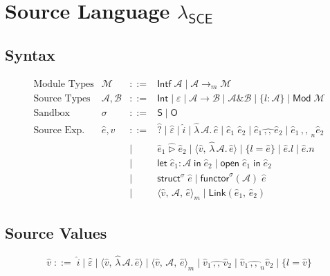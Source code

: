 \documentclass{article}
\newcommand{\fatcomma}{\mathbin{\,{,}{,}\,}}
\newcommand{\tand}{\mathbin{\&}}
\newcommand{\tarr}{\rightarrow}
\newcommand{\kw}[1]{\mathsf{#1}}
\newcommand{\smark}{\mathsf{S}}
\newcommand{\omark}{\mathsf{O}}
\newcommand{\shat}[1]{\hat{#1}}
\newcommand{\squery}{\hat{\textsf{?}}}
\newcommand{\slam}{\hat{\lambda}}
\newcommand{\sbox}{\mathbin{\hat{\triangleright}}}
\newcommand{\sdmrg}{\mathbin{\hat{\fatcomma}}}
\newcommand{\snmrg}{\mathbin{\hat{\fatcomma}_n}}
\newcommand{\mclos}[3]{\langle #1,\,#2,\,#3 \rangle_m}
\newcommand{\sclos}[3]{\langle #1,\,\slam\,#2.\,#3 \rangle}
\newcommand{\Link}[2]{\kw{Link}(#1,\,#2)}
\newcommand{\Struct}[2]{\kw{struct}^{#1}\;#2}
\newcommand{\Functor}[3]{\kw{functor}^{#1}(#2)\;#3}
\newcommand{\slet}[3]{\kw{let}\;#1:#2\;\kw{in}\;#3}
\newcommand{\sopen}[2]{\kw{open}\;#1\;\kw{in}\;#2}
\newcommand{\srec}[2]{\{#1 = #2\}}
\begin{document}
\section{Source Language $\lambda_{\mathsf{SCE}}$}

\subsection{Syntax}

\[
\begin{array}{lrcl}
\text{Module Types}  & \mathcal{M} & ::= & \kw{Intf}\;\mathcal{A}
                                     \mid  \mathcal{A} \tarr_m \mathcal{M} \\[4pt]
\text{Source Types}   & \mathcal{A}, \mathcal{B} & ::= &
    \kw{Int} \mid \varepsilon
    \mid \mathcal{A} \tarr \mathcal{B}
    \mid \mathcal{A} \tand \mathcal{B}
    \mid \{l : \mathcal{A}\}
    \mid \kw{Mod}\;\mathcal{M} \\[4pt]
\text{Sandbox}   & \sigma & ::= & \smark \mid \omark \\[4pt]
\text{Source Exp.} & \shat{e}, \shat{v} & ::= &
    \squery \mid \hat{\varepsilon} \mid \hat{i}
    \mid \slam\,\mathcal{A}.\,\shat{e}
    \mid \shat{e}_1\;\shat{e}_2
    \mid \shat{e}_1 \sdmrg \shat{e}_2
    \mid \shat{e}_1 \snmrg \shat{e}_2 \\
  & & \mid & \shat{e}_1 \sbox \shat{e}_2
    \mid \sclos{\shat{v}}{\mathcal{A}}{\shat{e}}
    \mid \srec{l}{\shat{e}}
    \mid \shat{e}.l
    \mid \shat{e}.n \\
  & & \mid & \slet{\shat{e}_1}{\mathcal{A}}{\shat{e}_2}
    \mid \sopen{\shat{e}_1}{\shat{e}_2} \\
  & & \mid & \Struct{\sigma}{\shat{e}}
    \mid \Functor{\sigma}{\mathcal{A}}{\shat{e}} \\
  & & \mid & \mclos{\shat{v}}{\mathcal{A}}{\shat{e}}
    \mid \Link{\shat{e}_1}{\shat{e}_2}
\end{array}
\]


\subsection{Source Values}

\[
  \shat{v} \;::=\; \hat{i} \mid \hat{\varepsilon}
    \mid \sclos{\shat{v}}{\mathcal{A}}{\shat{e}}
    \mid \mclos{\shat{v}}{\mathcal{A}}{\shat{e}}
    \mid \shat{v}_1 \sdmrg \shat{v}_2
    \mid \shat{v}_1 \snmrg \shat{v}_2
    \mid \srec{l}{\shat{v}}
\]
\end{document}

